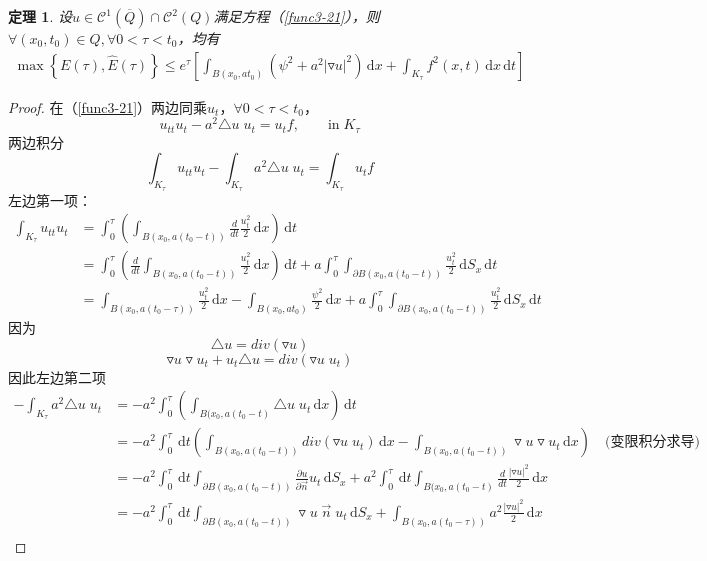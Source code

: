 \documentclass[11pt, a4paper]{article}
\theoremstyle{theorem}
\newtheorem{thm}{定理}[section]
\newcommand{\intd}[1]{\,\mathrm{d}{#1}}
\begin{document}
\begin{thm}
\label{thm-power}
设$u \in \mathcal{C}^1(\overline{Q}) \cap \mathcal{C}^2(Q)$满足方程（\ref{func3-21}），则$\forall (x_0, t_0) \in Q, \forall 0 < \tau < t_0$，均有
\begin{align}
    \max \left\{E(\tau), \hat{E}(\tau)\right\} \leq e^\tau \left[\int_{B(x_0, at_0)} (\psi^2 + a^2 |\triangledown u|^2) \intd x + \int_{K_\tau} f^2(x,t) \intd x \intd t\right]
\end{align}
\end{thm}

\begin{proof}
在（\ref{func3-21}）两边同乘$u_t$，$\forall 0 < \tau <t_0$，
$$
u_{tt} u_t - a^2 \triangle u \; u_t = u_t f,   \quad \quad \text{in} \; K_\tau
$$
两边积分
$$
\int_{K_\tau} u_{tt} u_t - \int_{K_\tau}  a^2 \triangle u \; u_t = \int_{K_\tau}  u_t f
$$
左边第一项：
\begin{align*}
    \int_{K_\tau} u_{tt} u_t &= \int_0^\tau \left( \int_{B(x_0, a(t_0 - t))}\frac{d}{d t} \frac{u_t^2}{2} \intd x\right) \intd t \\
    &= \int_0^\tau \left(\frac{d}{d t} \int_{B(x_0, a(t_0 - t))} \frac{u_t^2}{2} \intd x\right) \intd t +
    a \int_0^\tau \int_{\partial B(x_0, a(t_0 - t))} \frac{u_t^2}{2} \intd S_x \intd t \\
    &= \int_{B(x_0, a(t_0 - \tau))}\frac{u_t^2}{2} \intd x - \int_{B(x_0, at_0)} \frac{\psi^2}{2} \intd x +  a \int_0^\tau \int_{\partial B(x_0, a(t_0 - t))} \frac{u_t^2}{2} \intd S_x \intd t
\end{align*}
因为
$$
\triangle u = div(\triangledown u)
$$
$$
\triangledown u \triangledown u_t + u_t \triangle u = div(\triangledown u \; u_t)
$$
因此左边第二项
\begin{align*}
    - \int_{K_\tau}  a^2 \triangle u \; u_t &= - a^2 \int_0^\tau  \left(\int_{B(x_0, a(t_0 - t)} \triangle u \; u_t \intd x\right) \intd t \\
    &= -a^2 \int_0^\tau \intd t \left(\int_{B(x_0, a(t_0 - t))} div(\triangledown u \; u_t) \intd x- \int_{B(x_0, a(t_0 - t))} \triangledown u \triangledown u_t \intd x\right) \quad \text{(变限积分求导)}\\
    &= -a^2 \int_0^\tau \intd t \int_{\partial B(x_0, a(t_0 - t))} \frac{\partial u}{\partial \vec{n}} u_t \intd S_x + a^2 \int_0^\tau \intd t \int_{B(x_0, a(t_0 - t)} \frac{d}{d t} \frac{|\triangledown u|^2}{2} \intd x \\
    &= -a^2 \int_0^\tau \intd t \int_{\partial B(x_0, a(t_0 - t))}  \triangledown u \; \vec{n} \; u_t \intd S_x + \int_{B(x_0, a(t_0 - \tau))} a^2 \frac{|\triangledown u|^2}{2} \intd x  \\

\end{align*}
\end{proof}
\end{document}
